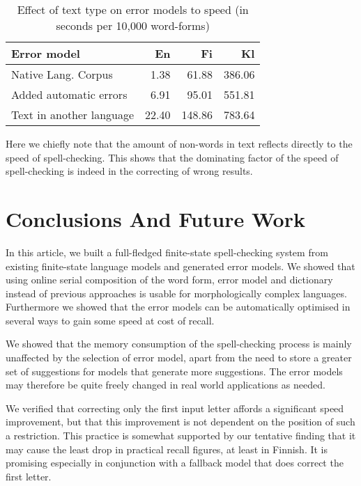 \documentclass[free]{flammie}
\begin{document}
\begin{table}[h]
\begin{center}
\begin{scriptsize}
\begin{tabular}{|l|rrr|}
\hline
\bf Error model & \bf En & \bf Fi & \bf Kl  \\ 
\hline
Native Lang. Corpus &
1.38&61.88&386.06
\\
Added automatic errors &
6.91&95.01&551.81
\\
Text in another language &
22.40&148.86&783.64
\\
\hline
\end{tabular}
\end{scriptsize}
\end{center}
\caption{\label{table:language-vs-text-type} Effect of text type on
error models to speed (in seconds per 10,000 word-forms)}
\end{table}

Here we chiefly note that the amount of non-words in text reflects directly to
the speed of spell-checking. This shows that the dominating factor of the
speed of spell-checking is indeed in the correcting of wrong results.

\section{Conclusions And Future Work}
\label{sec:conclusions}

In this article, we built a full-fledged finite-state spell-checking system from
existing finite-state language models and generated error models. We showed
that using online serial composition of the word form, error model and
dictionary instead of previous approaches is usable for morphologically
complex languages. Furthermore
we showed that the error models can be automatically optimised in several ways
to gain some speed at cost of recall.

We showed that the memory consumption of the spell-checking process is mainly
unaffected by the selection of error model, apart from the need to store
a greater set of suggestions for models that generate more suggestions. The
error models may therefore be quite freely changed in real world
applications as needed.

We verified that correcting only the first input letter affords a significant
speed improvement, but that this improvement is not dependent on the position
of such a restriction. This practice is somewhat supported by our tentative
finding that it may cause the least drop in practical recall figures, at least
in Finnish. It is promising especially in conjunction with a fallback model
that does correct the first letter.
\end{document}
